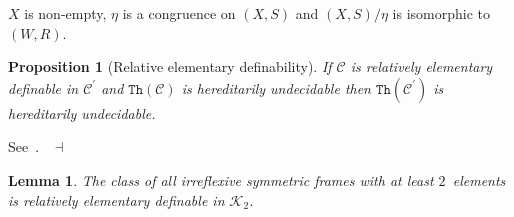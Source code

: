 \documentclass[draft]{article}
\newtheorem{lemma}{Lemma}
\newtheorem{proposition}{Proposition}
\newenvironment{proof}{{\bf Proof:}}{~$\dashv$\\}
\def\Th{\mathtt{Th}}
\begin{document}
%
%
$X$ is non-empty, $\eta$ is a congruence on $(X,S)$ and $(X,S)/\eta$ is isomorphic to $(W,R)$.
%
%
\begin{proposition}[Relative elementary definability]\label{Syntactic:Restriction:Lemma:hereditarily:undecidable}
%
%
If ${\mathcal C}$ is relatively
%
%
%
%
%
%
%
%
%
%
%
%
\linebreak
%
%
%
%
%
%
%
%
%
%
%
%
elementary definable in ${\mathcal C}^{\prime}$ and $\Th({\mathcal C})$ is hereditarily undecidable then $\Th({\mathcal C}^{\prime})$ is hereditarily undecidable.
%
%
\end{proposition}
%
%
\begin{proof}
%
%
See~\cite[Page~$272$]{Ershov:1980}.
%
%
\medskip
%
%
\end{proof}
%
%
\begin{lemma}\label{lemma:relatively:elementary:definable:K2}
%
%
The class of all irreflexive symmetric frames with at least $2$~elements is relatively elementary definable in ${\mathcal K}_{2}$.
%
%
\end{lemma}
%
%
\end{document}
